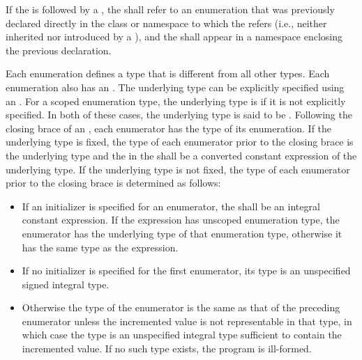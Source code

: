 \pnum
If the  is followed by a
, the  shall
refer to an enumeration that was previously declared directly in the class or
namespace to which the  refers (i.e., neither
inherited nor introduced by a ), and the
 shall appear in a namespace enclosing the previous
declaration.

\pnum
{}%
%
Each enumeration defines a type that is different from all other types.
Each enumeration also has an .
The underlying type can be explicitly specified using an .
For a scoped enumeration type, the underlying type is  if it is not
explicitly specified. In both of these cases, the underlying type is said to be
.
Following the closing brace of an , each
enumerator has the type of its enumeration.
If the underlying type is fixed, the type of each enumerator
prior to the closing brace is the underlying
type
and the  in the 
shall be a converted constant expression of the underlying
type.
If the underlying
type is not fixed,
the type of each enumerator prior to the closing brace is determined as
follows:

\begin{itemize}
\item If an
initializer is specified for an enumerator, the
 shall be an integral constant
expression. If the expression has
unscoped enumeration type, the enumerator has the underlying type of that
enumeration type, otherwise it has the same type as the expression.

\item If no initializer is specified for the
first enumerator, its type is an unspecified signed integral type.

\item  Otherwise
the type of the enumerator is the same as that of the
preceding enumerator unless the incremented value is not representable
in that type, in which case the type is an unspecified integral type
sufficient to contain the incremented value. If no such type exists, the program
is ill-formed.
\end{itemize}

